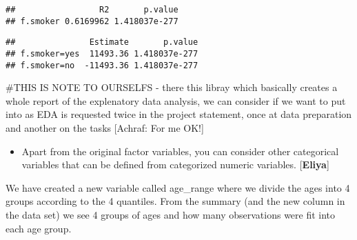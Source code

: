\documentclass[
]{article}
\newenvironment{Shaded}{\begin{snugshade}}{\end{snugshade}}
\newcommand{\AttributeTok}[1]{\textcolor[rgb]{0.77,0.63,0.00}{#1}}
\newcommand{\DecValTok}[1]{\textcolor[rgb]{0.00,0.00,0.81}{#1}}
\newcommand{\FloatTok}[1]{\textcolor[rgb]{0.00,0.00,0.81}{#1}}
\newcommand{\FunctionTok}[1]{\textcolor[rgb]{0.00,0.00,0.00}{#1}}
\newcommand{\NormalTok}[1]{#1}
\newcommand{\OtherTok}[1]{\textcolor[rgb]{0.56,0.35,0.01}{#1}}
\newcommand{\SpecialCharTok}[1]{\textcolor[rgb]{0.00,0.00,0.00}{#1}}
\providecommand{\tightlist}{%
  \setlength{\itemsep}{0pt}\setlength{\parskip}{0pt}}
\begin{document}
\begin{verbatim}
##                 R2       p.value
## f.smoker 0.6169962 1.418037e-277
\end{verbatim}

\begin{Shaded}
\end{Shaded}

\begin{verbatim}
##               Estimate       p.value
## f.smoker=yes  11493.36 1.418037e-277
## f.smoker=no  -11493.36 1.418037e-277
\end{verbatim}

\#THIS IS NOTE TO OURSELFS - there this libray which basically creates a
whole report of the explenatory data analysis, we can consider if we
want to put into as EDA is requested twice in the project statement,
once at data preparation and another on the tasks {[}Achraf: For me
OK!{]}

\begin{itemize}
\tightlist
\item
  Apart from the original factor variables, you can consider other
  categorical variables that can be defined from categorized numeric
  variables. {[}\textbf{Eliya}{]}
\end{itemize}

We have created a new variable called age\_range where we divide the
ages into 4 groups according to the 4 quantiles. From the summary (and
the new column in the data set) we see 4 groups of ages and how many
observations were fit into each age group.

\begin{Shaded}
\end{Shaded}
\end{document}
